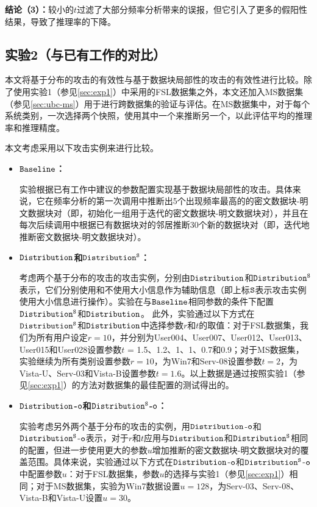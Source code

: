 \textbf{结论（3）：}较小的$t$过滤了大部分频率分析带来的误报，但它引入了更多的假阳性结果，导致了推理率的下降。

\subsection{实验2（与已有工作的对比）}
\label{sec:exp2}
本文将基于分布的攻击的有效性与基于数据块局部性的攻击的有效性进行比较\cite{li2017information}。除了使用实验1（参见\ref{sec:exp1}）中采用的FSL数据集之外，本文还加入MS数据集（参见\ref{sec:ubc-ms}）用于进行跨数据集的验证与评估。在MS数据集中，对于每个系统类别，一次选择两个快照，使用其中一个来推断另一个，以此评估平均的推理率和推理精度。

本文考虑采用以下攻击实例来进行比较。

\begin{itemize}[leftmargin=*]
\item \textbf{$\tt Baseline$：}

实验根据已有工作\cite{li2017information}中建议的参数配置实现基于数据块局部性的攻击。具体来说，它在频率分析的第一次调用中推断出5个出现频率最高的的密文数据块-明文数据块对（即，初始化一组用于迭代的密文数据块-明文数据块对），并且在每次后续调用中根据已有数据块对的邻居推断30个新的数据块对（即，迭代地推断密文数据块-明文数据块对）。

\item \textbf{$\tt Distribution$和$\tt Distribution^S$：} 

考虑两个基于分布的攻击的攻击实例，分别由$\tt Distribution$和$\tt Distribution^S$表示，它们分别使用和不使用大小信息作为辅助信息（即上标$\tt S$表示攻击实例使用大小信息进行操作）。实验在与${\tt Baseline}$相同参数的条件下配置$\tt Distribution^S$和${\tt Distribution}$。 此外，实验通过以下方式在$\tt Distribution^S$和${\tt Distribution}$中选择参数$r$和$t$的取值：对于FSL数据集，我们为所有用户设定$r = 10$，并分别为User004、User007、User012、User013、User015和User028设置参数$t$ = 1.5、1.2、1、1、0.7和0.9；对于MS数据集，实验继续为所有类别设置参数$r = 10$，为Win7和Serv-08设置参数$t = 2$，为Vista-U、Serv-03和Vista-B设置参数$t = 1.6$。以上数据是通过按照实验1（参见\ref{sec:exp1}）的方法对数据集的最佳配置的测试得出的。 
\item \textbf{$\tt Distribution$-$\tt o$和$\tt Distribution^S$-$\tt o$：}

实验考虑另外两个基于分布的攻击的实例，用$\tt Distribution$-$\tt o$和$\tt Distribution^S$-$\tt o$表示，对于$r$和$t$应用与$\tt Distribution$和$\tt Distribution^S$相同的配置，但进一步使用更大的参数$u$增加推断的密文数据块-明文数据块对的覆盖范围。具体来说，实验通过以下方式在$\tt Distribution$-$\tt o$和$\tt Distribution^S$-$\tt o$中配置参数$u$：对于FSL数据集，参数$u$的选择与实验1（参见\ref{sec:exp1}）相同；对于MS数据集，实验为Win7数据设置$u = 128$，为Serv-03、Serv-08、Vista-B和Vista-U设置$u  = 30$。 
\end{itemize}

